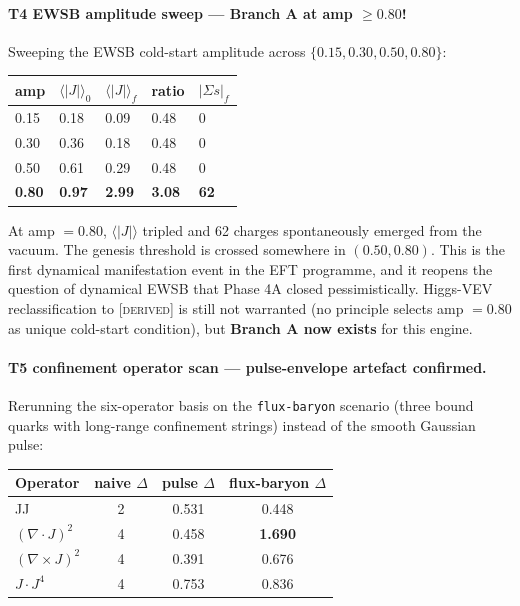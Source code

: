 \documentclass[11pt,letterpaper]{article}
\begin{document}
\paragraph{T4 EWSB amplitude sweep — Branch A at amp $\geq 0.80$!}
Sweeping the EWSB cold-start amplitude across
$\{0.15, 0.30, 0.50, 0.80\}$:

\begin{center}
\begin{tabular}{lllll}
\toprule
amp & $\langle|J|\rangle_0$ & $\langle|J|\rangle_f$ & ratio & $|\Sigma s|_f$ \\
\midrule
0.15 & 0.18 & 0.09 & 0.48 & 0 \\
0.30 & 0.36 & 0.18 & 0.48 & 0 \\
0.50 & 0.61 & 0.29 & 0.48 & 0 \\
\textbf{0.80} & \textbf{0.97} & \textbf{2.99} & \textbf{3.08} & \textbf{62} \\
\bottomrule
\end{tabular}
\end{center}

At amp $= 0.80$, $\langle|J|\rangle$ tripled and 62 charges spontaneously
emerged from the vacuum. The genesis threshold is crossed somewhere in
$(0.50, 0.80)$. This is the first dynamical manifestation event in the
EFT programme, and it reopens the question of dynamical EWSB that
Phase 4A closed pessimistically. Higgs-VEV reclassification to
[\textsc{derived}] is still not warranted (no principle selects amp
$= 0.80$ as unique cold-start condition), but \textbf{Branch A now exists}
for this engine.

\paragraph{T5 confinement operator scan — pulse-envelope artefact confirmed.}
Rerunning the six-operator basis on the \texttt{flux-baryon} scenario
(three bound quarks with long-range confinement strings) instead of
the smooth Gaussian pulse:

\begin{center}
\begin{tabular}{lccc}
\toprule
Operator & naive $\Delta$ & pulse $\Delta$ & flux-baryon $\Delta$ \\
\midrule
JJ            & 2 & 0.531 & 0.448 \\
$(\nabla\cdot J)^2$  & 4 & 0.458 & \textbf{1.690} \\
$(\nabla\times J)^2$ & 4 & 0.391 & 0.676 \\
$J \cdot J^4$ & 4 & 0.753 & 0.836 \\
\bottomrule
\end{tabular}
\end{center}
\end{document}
